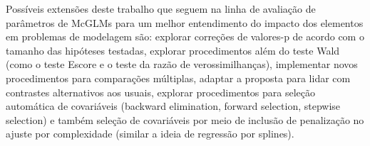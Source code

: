 Possíveis extensões deste trabalho que seguem na linha de avaliação de parâmetros de McGLMs para um melhor entendimento do impacto dos elementos em problemas de modelagem são: explorar correções de valores-p de acordo com o tamanho das hipóteses testadas, explorar procedimentos além do teste Wald (como o teste Escore e o teste da razão de verossimilhanças), implementar novos procedimentos para comparações múltiplas, adaptar a proposta para lidar com contrastes alternativos aos usuais, explorar procedimentos para seleção automática de covariáveis (backward elimination, forward selection, stepwise selection) e também seleção de covariáveis por meio de inclusão de penalização no ajuste por complexidade (similar a ideia de regressão por splines).


